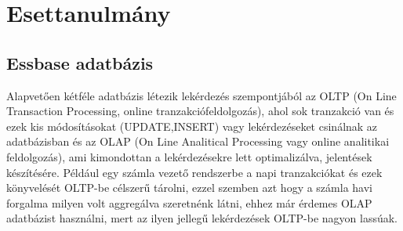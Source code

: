 \chapter{Esettanulmány}\label{sect:Preliminaries}
\section{Essbase adatbázis}
Alapvetően kétféle adatbázis létezik lekérdezés szempontjából az OLTP (On Line
Transaction Processing, online tranzakciófeldolgozás), ahol sok tranzakció van és ezek kis
módosításokat (UPDATE,INSERT) vagy lekérdezéseket csinálnak az
adatbázisban és az OLAP (On Line Analitical Processing vagy online
analitikai feldolgozás), ami kimondottan a lekérdezésekre lett optimalizálva,
jelentések készítésére. Például egy számla vezető rendszerbe a napi
tranzakciókat és ezek könyvelését OLTP-be célszerű tárolni, ezzel szemben azt
hogy a számla havi forgalma milyen volt aggregálva szeretnénk látni, ehhez már
érdemes OLAP adatbázist használni, mert az ilyen jellegű lekérdezések OLTP-be
nagyon lassúak. 
